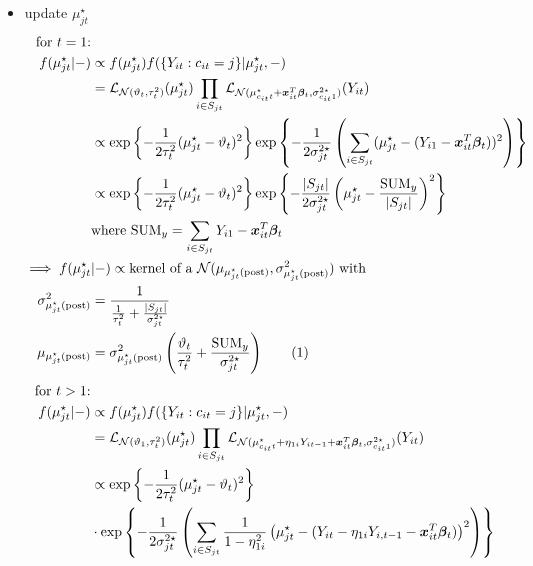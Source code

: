 \documentclass[12pt,	%
	a4paper,		%
	twoside,		%
	openright,		%
	titlepage,%
	]{book}
\theoremstyle{definition}
\begin{document}
\begin{itemize}
\item update $\mu^\star_{jt}$
\begin{align*}
\text{for $t=1$:}&\\
    f({\mu}_{jt}^\star|-)&\propto f({\mu}_{jt}^\star)f(\{Y_{it} : c_{it}=j\}|\mu^\star_{jt},-)\\
    &=\law_{\N(\theta_t,\tau^2_t)}(\mu^\star_{jt})\prod_{i\in S_{jt}}\law_{\N(\mu^\star_{c_{it}t}+ \vec{x}_{it}^T\vec{\beta}_t,\sigma^{2\star}_{c_{it}1})}(Y_{it})\\
    &\propto \expp{-\frac{1}{2\tau_t^2}(\mu^\star_{jt}-\theta_t)^2} \expp{-\frac{1}{2\sigma^{2\star}_{jt}}\left( \sum_{i \in S_{jt}} (\mu_{jt}^\star - (Y_{i1}-\vec{x}_{it}^T\vec{\beta}_t))^2 \right)}\\
    &\propto \expp{-\frac{1}{2\tau_t^2}(\mu^\star_{jt}-\theta_t)^2} \expp{-\frac{|S_{jt}|}{2\sigma^{2\star}_{jt}}\left( \mu^\star_{jt} - \frac{\text{SUM}_y}{|S_{jt}|} \right)^2}\\
    &\text{where SUM}_y = \sum_{i \in S_{jt}} Y_{i1}-\vec{x}_{it}^T\vec{\beta}_t\\
\implies f(\mu^\star_{jt}&|-) \propto \text{kernel of a $\N(\mu_{\postp{\mu^\star_{jt}}},\sigma^2_{\postp{\mu^\star_{jt}}})$ with}\\
\sigma^2_{\postp{\mu^\star_{jt}}}&=\frac{1}{\frac{1}{\tau^2_t}+\frac{|S_{jt}|}{\sigma^{2\star}_{jt}}}\\
%
\mu_{\postp{\mu^\star_{jt}}}&=\sigma^2_{\postp{\mu^\star_{jt}}}\left( \frac{\theta_t}{\tau_t^2} + \frac{\text{SUM}_y}{\sigma^{2\star}_{jt}} \right)
\tag{\stepcounter{equation}\theequation}
\end{align*}
\begin{align*}
\text{for $t>1$:}&\\
    f({\mu}_{jt}^\star|-)&\propto f({\mu}_{jt}^\star)f(\{Y_{it}: c_{it}=j\}|\mu^\star_{jt},-)\\
    &=\law_{\N(\theta_1,\tau^2_t)}(\mu^\star_{jt})\prod_{i\in S_{jt}}\law_{\N(\mu^\star_{c_{it}t} +\eta_{1i}Y_{it-1}+ \vec{x}_{it}^T\vec{\beta}_t,\sigma^{2\star}_{c_{it}1})}(Y_{it})\\
    &\propto \expp{-\frac{1}{2\tau_t^2}(\mu^\star_{jt}-\theta_t)^2}\\&\cdot \expp{-\frac{1}{2\sigma^{2\star}_{jt}}\left( \sum_{i \in S_{jt}} \frac{1}{1-\eta_{1i}^2}\left(\mu_{jt}^\star - (Y_{it}-\eta_{1i}Y_{i,t-1}-\vec{x}_{it}^T\vec{\beta}_t)\right)^2 \right)} \\

\end{align*}
\end{itemize}
\end{document}
